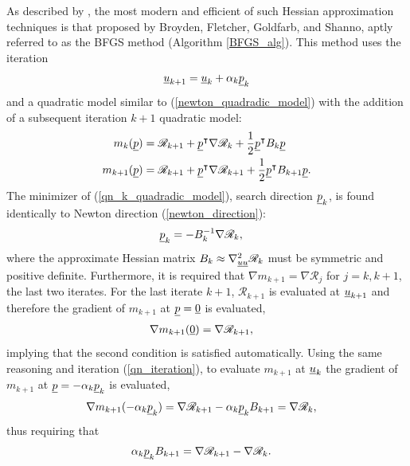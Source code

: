 As described by \citet{nocedal_2000}, the most modern and efficient of such Hessian approximation techniques is that proposed by Broyden, Fletcher, Goldfarb, and Shanno, aptly referred to as the BFGS method (Algorithm \ref{BFGS_alg}).  This method uses the iteration
\begin{align}
  \label{qn_iteration}
  \underline{u}_{k+1} = \underline{u}_k + \alpha_k \underline{p}_k
\end{align}
and a quadratic model similar to (\ref{newton_quadradic_model}) with the addition of a subsequent iteration $k+1$ quadratic model:
\begin{align}
  \label{qn_k_quadradic_model}
  m_{k}(\underline{p}) &= \mathscr{R}_{k+1} + \underline{p}^\intercal \nabla \mathscr{R}_{k} + \frac{1}{2} \underline{p}^\intercal B_{k} \underline{p} \\
  \label{qn_k+1_quadradic_model}
  m_{k+1}(\underline{p}) &= \mathscr{R}_{k+1} + \underline{p}^\intercal \nabla \mathscr{R}_{k+1} + \frac{1}{2} \underline{p}^\intercal B_{k+1} \underline{p}.
\end{align}
The minimizer of (\ref{qn_k_quadradic_model}), search direction $\underline{p}_k$, is found identically to Newton direction (\ref{newton_direction}):
\begin{align*}
  \underline{p}_k &= - B_k^{-1} \nabla \mathscr{R}_k,
\end{align*}
where the approximate Hessian matrix $B_k \approx \nabla_{\underline{u} \underline{u}}^2 \mathscr{R}_k$ must be symmetric and positive definite.  Furthermore, it is required that $\nabla m_{k+1} = \nabla \mathscr{R}_j$ for $j = k, k+1$, the last two iterates.  For the last iterate $k+1$, $\mathscr{R}_{k+1}$ is evaluated at $\underline{u}_{k+1}$ and therefore the gradient of $m_{k+1}$ at $\underline{p} = \underline{0}$ is evaluated,
\begin{align*}
  \nabla m_{k+1}(\underline{0}) &= \nabla \mathscr{R}_{k+1},
\end{align*}
implying that the second condition is satisfied automatically.  Using the same reasoning and iteration (\ref{qn_iteration}), to evaluate $m_{k+1}$ at $\underline{u}_{k}$ the gradient of $m_{k+1}$ at $\underline{p} = -\alpha_k \underline{p}_k$ is evaluated,
\begin{align*}
  \nabla m_{k+1}(-\alpha_k \underline{p}_{k}) &= \nabla \mathscr{R}_{k+1} - \alpha_k \underline{p}_{k} B_{k+1} = \nabla \mathscr{R}_k,
\end{align*}
thus requiring that
\begin{align*}
  \alpha_k \underline{p}_k B_{k+1} &= \nabla \mathscr{R}_{k+1} - \nabla \mathscr{R}_k.
\end{align*}
